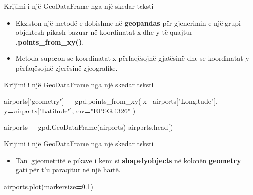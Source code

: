 \documentclass[
  ignorenonframetext,
]{beamer}
\newenvironment{Shaded}{\begin{snugshade}}{\end{snugshade}}
\newcommand{\FloatTok}[1]{\textcolor[rgb]{0.00,0.00,0.81}{#1}}
\newcommand{\NormalTok}[1]{#1}
\newcommand{\OperatorTok}[1]{\textcolor[rgb]{0.81,0.36,0.00}{\textbf{#1}}}
\newcommand{\StringTok}[1]{\textcolor[rgb]{0.31,0.60,0.02}{#1}}
\providecommand{\tightlist}{%
  \setlength{\itemsep}{0pt}\setlength{\parskip}{0pt}}
\begin{document}
\begin{frame}{Krijimi i një GeoDataFrame nga një skedar teksti}
\protect\hypertarget{krijimi-i-njuxeb-geodataframe-nga-njuxeb-skedar-teksti-5}{}
\begin{itemize}
\item
  Ekziston një metodë e dobishme në \textbf{geopandas} për gjenerimin e
  një grupi objektesh pikash bazuar në koordinatat x dhe y të quajtur
  \textbf{.points\_from\_xy()}.
\item
  Metoda supozon se koordinatat x përfaqësojnë gjatësinë dhe se
  koordinatat y përfaqësojnë gjerësinë gjeografike.
\end{itemize}
\end{frame}

\begin{frame}[fragile]{Krijimi i një GeoDataFrame nga një skedar teksti}
\protect\hypertarget{krijimi-i-njuxeb-geodataframe-nga-njuxeb-skedar-teksti-6}{}

\begin{Shaded}
\begin{Highlighting}[]
\NormalTok{airports[}\StringTok{"geometry"}\NormalTok{] }\OperatorTok{=}\NormalTok{ gpd.points\_from\_xy(}
\NormalTok{    x}\OperatorTok{=}\NormalTok{airports[}\StringTok{"Longitude"}\NormalTok{], y}\OperatorTok{=}\NormalTok{airports[}\StringTok{"Latitude"}\NormalTok{], crs}\OperatorTok{=}\StringTok{"EPSG:4326"}
\NormalTok{)}

\NormalTok{airports }\OperatorTok{=}\NormalTok{ gpd.GeoDataFrame(airports)}
\NormalTok{airports.head()}
\end{Highlighting}
\end{Shaded}
\end{frame}

\begin{frame}[fragile]{Krijimi i një GeoDataFrame nga një skedar teksti}
\protect\hypertarget{krijimi-i-njuxeb-geodataframe-nga-njuxeb-skedar-teksti-7}{}
\begin{itemize}
\tightlist
\item
  Tani gjeometritë e pikave i kemi si \textbf{shapelyobjects} në kolonën
  \textbf{geometry} gati për t'u paraqitur në një hartë.
\end{itemize}


\begin{Shaded}
\begin{Highlighting}[]
\NormalTok{airports.plot(markersize}\OperatorTok{=}\FloatTok{0.1}\NormalTok{)}
\end{Highlighting}
\end{Shaded}
\end{frame}
\end{document}
